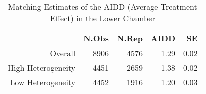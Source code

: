 \begin{table}[ht]
\centering
\begin{tabular}{rrrrr}
  \hline
 & N.Obs & N.Rep & AIDD & SE \\ 
  \hline
Overall & 8906 & 4576 & 1.29 & 0.02 \\ 
  High Heterogeneity & 4451 & 2659 & 1.38 & 0.02 \\ 
  Low Heterogeneity & 4452 & 1916 & 1.20 & 0.03 \\ 
   \hline
\end{tabular}
\caption{Matching Estimates of the AIDD (Average Treatment Effect) in the Lower Chamber} 
\label{matching.estsh}
\end{table}
